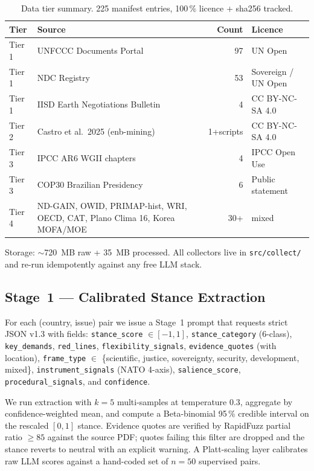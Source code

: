 \documentclass[11pt,a4paper]{article}
\begin{document}
\begin{table}[ht]
\centering
\small
\caption{Data tier summary. 225 manifest entries, 100\,\% licence + sha256 tracked.}
\label{tab:data}
\begin{tabular}{@{}llrl@{}}
\toprule
Tier & Source & Count & Licence \\ \midrule
Tier 1 & UNFCCC Documents Portal & 97 & UN Open \\
Tier 1 & NDC Registry & 53 & Sovereign / UN Open \\
Tier 1 & IISD Earth Negotiations Bulletin & 4 & CC BY-NC-SA 4.0 \\
Tier 2 & Castro et al.\ 2025 (enb-mining) & 1+scripts & CC BY-NC-SA 4.0 \\
Tier 3 & IPCC AR6 WGII chapters & 4 & IPCC Open Use \\
Tier 3 & COP30 Brazilian Presidency & 6 & Public statement \\
Tier 4 & ND-GAIN, OWID, PRIMAP-hist, WRI, OECD, CAT, Plano Clima 16, Korea MOFA/MOE & 30+ & mixed \\ \bottomrule
\end{tabular}
\end{table}

Storage: $\sim$720~MB raw + 35~MB processed. All collectors live in \texttt{src/collect/} and re-run idempotently against any free LLM stack.

\subsection{Stage~1 --- Calibrated Stance Extraction}

For each (country, issue) pair we issue a Stage~1 prompt that requests strict JSON v1.3 with fields: \texttt{stance\_score} $\in [-1,1]$, \texttt{stance\_category} (6-class), \texttt{key\_demands}, \texttt{red\_lines}, \texttt{flexibility\_signals}, \texttt{evidence\_quotes} (with location), \texttt{frame\_type} $\in$ \{scientific, justice, sovereignty, security, development, mixed\}, \texttt{instrument\_signals} (NATO 4-axis), \texttt{salience\_score}, \texttt{procedural\_signals}, and \texttt{confidence}.

We run extraction with $k=5$ multi-samples at temperature 0.3, aggregate by confidence-weighted mean, and compute a Beta-binomial 95\,\% credible interval on the rescaled $[0,1]$ stance. Evidence quotes are verified by RapidFuzz partial ratio $\geq 85$ against the source PDF; quotes failing this filter are dropped and the stance reverts to neutral with an explicit warning. A Platt-scaling layer \citep{platt1999} calibrates raw LLM scores against a hand-coded set of $n=50$ supervised pairs.
\end{document}
